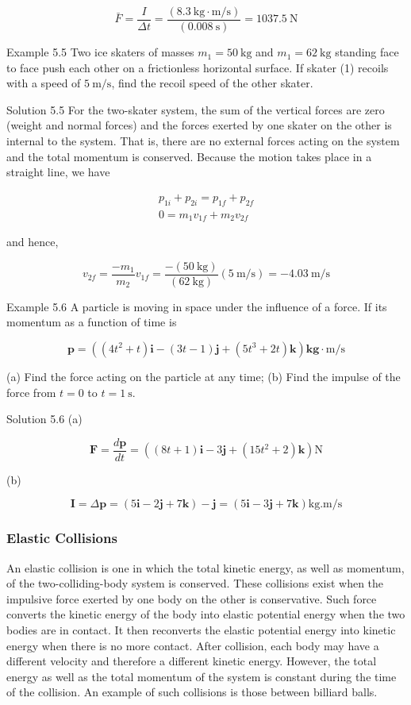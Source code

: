 \documentclass[10pt]{article}
\numberwithin{equation}{section}
\begin{document}
$$
\bar{F}=\frac{I}{\Delta t}=\frac{(8.3 \mathrm{~kg} \cdot \mathrm{m} / \mathrm{s})}{(0.008 \mathrm{~s})}=1037.5 \mathrm{~N}
$$

Example 5.5 Two ice skaters of masses $m_{1}=50 \mathrm{~kg}$ and $m_{1}=62 \mathrm{~kg}$ standing face to face push each other on a frictionless horizontal surface. If skater (1) recoils with a speed of $5 \mathrm{~m} / \mathrm{s}$, find the recoil speed of the other skater.

Solution 5.5 For the two-skater system, the sum of the vertical forces are zero (weight and normal forces) and the forces exerted by one skater on the other is internal to the system. That is, there are no external forces acting on the system and the total momentum is conserved. Because the motion takes place in a straight line, we have

$$
\begin{gathered}
p_{1 i}+p_{2 i}=p_{1 f}+p_{2 f} \\
0=m_{1} v_{1 f}+m_{2} v_{2 f}
\end{gathered}
$$

and hence,

$$
v_{2 f}=\frac{-m_{1}}{m_{2}} v_{1 f}=\frac{-(50 \mathrm{~kg})}{(62 \mathrm{~kg})}(5 \mathrm{~m} / \mathrm{s})=-4.03 \mathrm{~m} / \mathrm{s}
$$

Example 5.6 A particle is moving in space under the influence of a force. If its momentum as a function of time is

$$
\mathbf{p}=\left(\left(4 t^{2}+t\right) \mathbf{i}-(3 t-1) \mathbf{j}+\left(5 t^{3}+2 t\right) \mathbf{k}\right) \mathbf{k g} \cdot \mathrm{m} / \mathrm{s}
$$

(a) Find the force acting on the particle at any time; (b) Find the impulse of the force from $t=0$ to $t=1 \mathrm{~s}$.

Solution 5.6 (a)

$$
\mathbf{F}=\frac{d \mathbf{p}}{d t}=\left((8 t+1) \mathbf{i}-3 \mathbf{j}+\left(15 t^{2}+2\right) \mathbf{k}\right) \mathrm{N}
$$

(b)

$$
\mathbf{I}=\Delta \mathbf{p}=(5 \mathbf{i}-2 \mathbf{j}+7 \mathbf{k})-\mathbf{j}=(5 \mathbf{i}-3 \mathbf{j}+7 \mathbf{k}) \mathrm{kg} . \mathrm{m} / \mathrm{s}
$$

\subsubsection{Elastic Collisions}\label{sec:5-4-1}
An elastic collision is one in which the total kinetic energy, as well as momentum, of the two-colliding-body system is conserved. These collisions exist when the impulsive force exerted by one body on the other is conservative. Such force converts the kinetic energy of the body into elastic potential energy when the two bodies are in contact. It then reconverts the elastic potential energy into kinetic energy when there is no more contact. After collision, each body may have a different velocity and therefore a different kinetic energy. However, the total energy as well as the total momentum of the system is constant during the time of the collision. An example of such collisions is those between billiard balls.
\end{document}
